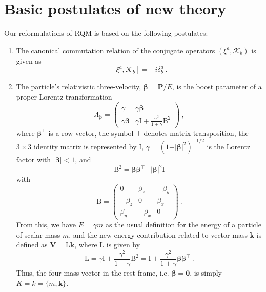 \documentclass[12pt]{iopart}
\begin{document}
\section{Basic postulates of new theory}

Our reformulations of RQM is based on the following postulates:
%
\begin{enumerate}
%
\item The canonical commutation relation of the conjugate operators 
$(\xi^a,\mathcal{K}_b)$ is given as
%
	\begin{equation}
        \left[\xi^a,\mathcal{K}_b\right]=-i\delta^{a}_{b}\ .
        \label{S3eq1}
	\end{equation}
%
\item The particle's relativistic three-velocity, $\boldsymbol{\beta}=\boldsymbol{P}/E$, 
is the boost parameter of a proper Lorentz transformation
%
	\begin{equation}
        \Lambda_{\boldsymbol{\beta}}=
        \begin{pmatrix}
        \gamma & \gamma\boldsymbol{\beta}^{\top} \\
        \gamma\boldsymbol{\beta} & \gamma\mathrm{I}+\frac{\gamma^2}{1+\gamma}\mathrm{B}^2
        \end{pmatrix}\ ,
        \label{S3eq2}
	\end{equation}
%
where $\boldsymbol{\beta}^\top$ is a row vector, the symbol $\top$ denotes 
matrix transposition, the $3\times 3$ identity matrix is represented by $\mathrm{I}$, 
$\gamma = \left(1-\vert\boldsymbol{\beta}\vert^2\right)^{-1/2}$ is the Lorentz factor
with $\vert\boldsymbol{\beta}\vert<1$, and
%
    \begin{equation}
        \mathrm{B}^2=\boldsymbol{\beta}\boldsymbol{\beta}^{\top}
        -\vert\boldsymbol{\beta}\vert^2\mathrm{I}
    \end{equation}
%
with
%
	\begin{equation}
        \mathrm{B}=\begin{pmatrix}
        0 & \beta_z & -\beta_y \\
        -\beta_z & 0 & \beta_x \\
        \beta_y & -\beta_x & 0
        \end{pmatrix}\ .
        \label{S3eq3}
	\end{equation}
%
From this, we have $E=\gamma m$ as the usual definition for the energy of a particle of 
scalar-mass $m$, and the new energy contribution related to vector-mass $\boldsymbol{k}$ 
is defined as $\boldsymbol{V}=\mathrm{L}\boldsymbol{k}$, where $\mathrm{L}$ is 
given by
%
    \begin{equation}
        \mathrm{L}=\gamma\mathrm{I}+\frac{\gamma^2}{1+\gamma}\mathrm{B}^2=
\mathrm{I}+\frac{\gamma^2}{1+\gamma}\boldsymbol{\beta}\boldsymbol{\beta}^\top\ .
    \end{equation}
%
Thus, the four-mass vector in the rest frame, i.e. $\boldsymbol{\beta}=\boldsymbol{0}$, 
is simply $K=k=\{m,\boldsymbol{k}\}$.


\end{enumerate}
\end{document}
